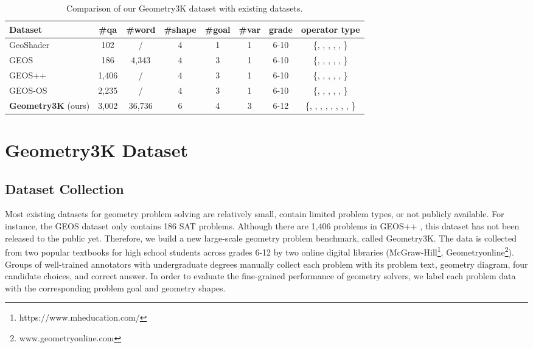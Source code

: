 \documentclass[11pt,a4paper]{article}
\begin{document}
\begin{table*}[th!]
\centering 
\setlength{\tabcolsep}{3pt}
\small 
\begin{tabular}{l|ccccccc}
	\hline
	\textbf{Dataset} & \#qa & \#word & \#shape & \#goal & \#var & grade & operator type \\ 
	\hline
	GeoShader \cite{alvin2017synthesis} & 102 & / & 4 & 1 & 1 & 6-10  & \{, , , , , \} \\
	GEOS \cite{seo2015solving} & 186 & 4,343 & 4 & 3 & 1 & 6-10  & \{, , , , , \} \\ 
	GEOS++ \cite{sachan2017textbooks} & 1,406 & / & 4 & 3 & 1 & 6-10 & \{, , , , , \} \\
	GEOS-OS \cite{sachan2017learning} & 2,235 & / & 4 & 3 & 1 & 6-10 & \{, , , , , \} \\
	\textbf{Geometry3K} (ours) & 3,002 & 36,736 & 6 & 4 & 3 & 6-12 & \footnotesize \{, , , , , , , , \} \\
	\hline
\end{tabular}
\vspace{0mm}
\caption{Comparison of our Geometry3K dataset with existing datasets. }
\vspace{0mm}
\label{table:dataset}
\end{table*}

\section{Geometry3K Dataset}
\subsection{Dataset Collection}\label{sec:dataset}
Most existing datasets for geometry problem solving are relatively small, contain limited problem types, or not publicly available. For instance, the GEOS dataset \citep{seo2015solving} only contains 186 SAT problems. Although there are 1,406 problems in GEOS++ \citep{sachan2017textbooks}, this dataset has not been released to the public yet. Therefore, we build a new large-scale geometry problem benchmark, called Geometry3K. The data is collected from two popular textbooks for high school students across grades 6-12 by two online digital libraries (McGraw-Hill\footnote{https://www.mheducation.com/}, Geometryonline\footnote{www.geometryonline.com }). Groups of well-trained annotators with undergraduate degrees manually collect each problem with its problem text, geometry diagram, four candidate choices, and correct answer. 
In order to evaluate the fine-grained performance of geometry solvers, we label each problem data with the corresponding  problem goal and geometry shapes. 
\end{document}
